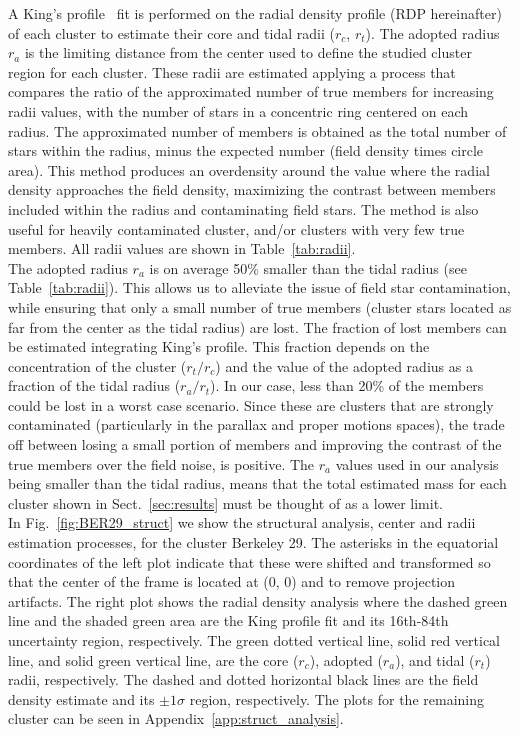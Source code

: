 \documentclass[referee]{aa}
\begin{document}
  A King's profile~\citep{King_1962} fit is performed on the radial
  density profile (RDP hereinafter) of each cluster to estimate their core and
  tidal radii ($r_{c}$, $r_{t}$). The adopted radius $r_{a}$ is the limiting
  distance from the center used to define the studied cluster region for each
  cluster. These radii are estimated applying a process that compares the
  ratio of the approximated number of true members for increasing radii values,
  with the number of stars in a concentric ring centered on each radius. The
  approximated number of members is obtained as the total number of stars within
  the radius, minus the expected number (field density times circle area). This
  method produces an overdensity around the value where the radial density
  approaches the field density, maximizing the contrast between members included
  within the radius and contaminating field stars. The method is also useful
  for heavily contaminated cluster, and/or clusters with very few true
  members. All radii values are shown in Table~\ref{tab:radii}.\\

  The adopted radius $r_{a}$ is on average 50\% smaller than the
  tidal radius (see Table~\ref{tab:radii}). This allows us to alleviate the
  issue of field star contamination, while ensuring that only a small number of
  true members (cluster stars located as far from the center as the tidal
  radius) are lost.
  The fraction of lost members can be estimated integrating King's profile. This
  fraction depends on the concentration of the cluster ($r_{t}/r_{c}$) and the
  value of the adopted radius as a fraction of the tidal radius ($r_{a}/r_{t}$).
  In our case, less than 20\% of the members could be lost in a worst case
  scenario. Since these are clusters that are strongly contaminated 
  (particularly in the parallax and proper motions spaces), the trade off
  between losing a small portion of members and improving the contrast of the
  true members over the field noise, is positive.
  The $r_{a}$ values used in our analysis being smaller than the tidal radius,
  means that the total estimated mass for each cluster shown in
  Sect.~\ref{sec:results} must be thought of as a lower limit.\\

  In Fig.~\ref{fig:BER29_struct} we show the structural analysis, center and
  radii estimation processes, for the cluster Berkeley 29. The asterisks in the
  equatorial coordinates of the left plot indicate that these were shifted
  and transformed so that the center of the frame is located at (0, 0) and to
  remove projection artifacts. The right plot shows the radial density analysis
  where the dashed green line and the shaded green area are the King profile fit
  and its 16th-84th uncertainty region, respectively. The green dotted vertical
  line, solid red vertical line, and solid green vertical line, are the core 
  ($r_{c}$), adopted ($r_{a}$), and tidal ($r_{t}$) radii, respectively. The
  dashed and dotted horizontal black lines are the field density estimate and
  its $\pm1\sigma$ region, respectively. The plots for the remaining cluster can
  be seen in Appendix~\ref{app:struct_analysis}.
\end{document}
